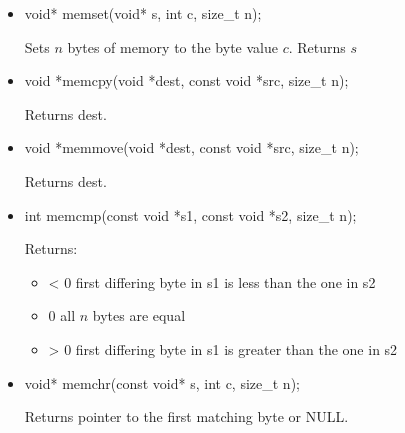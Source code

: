 \documentclass{report}
\begin{document}
    \pagebreak 
    \begin{itemize}
        \item
            \bigbreak \noindent 
            \begin{cppcode}
                void* memset(void* s, int c, size_t n);
            \end{cppcode}
            \bigbreak \noindent 
            Sets $n$ bytes of memory to the byte value $c$.
            \bigbreak \noindent 
            Returns $s$
        \item
            \bigbreak \noindent 
            \begin{cppcode}
            void *memcpy(void *dest, const void *src, size_t n);
            \end{cppcode}
            \bigbreak \noindent 
            Returns dest.
        \item
            \bigbreak \noindent 
            \begin{cppcode}
            void *memmove(void *dest, const void *src, size_t n);
            \end{cppcode}
            \bigbreak \noindent 
            Returns dest.
        \item
            \bigbreak \noindent 
            \begin{cppcode}
                int memcmp(const void *s1, const void *s2, size_t n);
            \end{cppcode}
            \bigbreak \noindent 
            Returns:
            \begin{itemize}
                \item < 0   first differing byte in s1 is less than the one in s2
                \item 0   all $n$ bytes are equal
                \item > 0   first differing byte in s1 is greater than the one in s2
            \end{itemize}
        \item 
            \bigbreak \noindent 
            \begin{cppcode}
            void* memchr(const void* s, int c, size_t n); 
            \end{cppcode}
            \bigbreak \noindent 
            Returns pointer to the first matching byte or NULL.

    \end{itemize}
\end{document}
